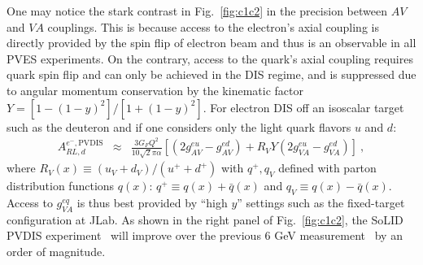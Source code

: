 One may notice the stark contrast in Fig.~\ref{fig:c1c2} in the precision between $AV$ and $VA$ couplings. This is because access to the electron's axial coupling is directly provided by the spin flip of electron beam and thus is an observable in all PVES experiments. On the contrary, access to the quark's axial coupling requires quark spin flip and can only be achieved in the DIS regime, and is suppressed due to angular momentum conservation by the kinematic factor 
$Y=[1-(1-y)^2]/[1+(1-y)^2]$. For electron DIS off an isoscalar target such as the deuteron and if one considers only the light quark flavors $u$ and $d$: 
\begin{eqnarray}
  A^{e^-,\mathrm{PVDIS}}_{RL,d}
    &\approx& \frac{3G_F Q^2}{10\sqrt{2}\pi\alpha}\left[(2g_{AV}^{eu}-g_{AV}^{ed})+R_V Y(2g_{VA}^{eu}-g_{VA}^{ed})\right]~,
\end{eqnarray}
where $R_V(x) \equiv ({u_V+d_V})/({u^+ + d^+})$ 
with $q^+, q_V$ defined with parton distribution functions $q(x)$: $q^+\equiv q(x)+\bar q(x)$ and $q_V\equiv q(x)-\bar q(x)$.
%
Access to $g_{VA}^{eq}$ is thus best provided by ``high $y$'' settings such as the fixed-target configuration at JLab. As shown in the right panel of Fig.~\ref{fig:c1c2}, the SoLID PVDIS experiment~\cite{PVDIS} will improve over the previous 6 GeV measurement~\cite{Wang:2014bba,Wang:2014guo} by an order of magnitude. 


